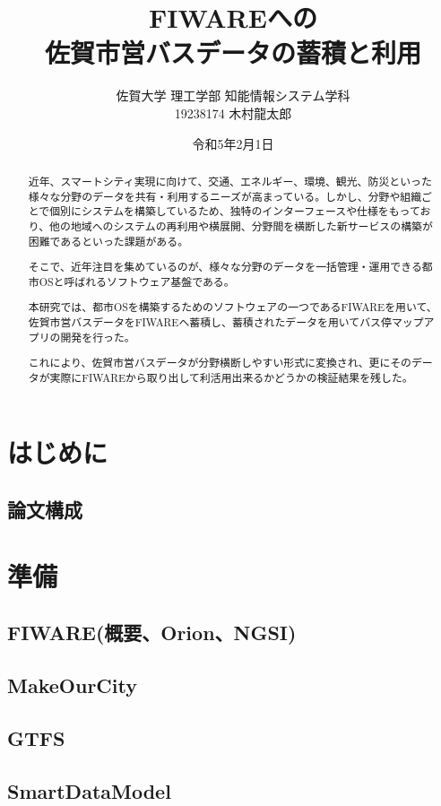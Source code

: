 \documentclass[a4paper, 12pt]{jsreport}
\title{FIWAREへの\\
佐賀市営バスデータの蓄積と利用
}
\author{佐賀大学
理工学部
知能情報システム学科\\
19238174
木村龍太郎}
\date{令和5年2月1日}
\begin{document}
  \maketitle


  \begin{abstract}
    \par 近年、スマートシティ実現に向けて、交通、エネルギー、環境、観光、防災といった様々な分野のデータを共有・利用するニーズが高まっている。しかし、分野や組織ごとで個別にシステムを構築しているため、独特のインターフェースや仕様をもっており、他の地域へのシステムの再利用や横展開、分野間を横断した新サービスの構築が困難であるといった課題がある。
    \par そこで、近年注目を集めているのが、様々な分野のデータを一括管理・運用できる都市OSと呼ばれるソフトウェア基盤である。
    \par 本研究では、都市OSを構築するためのソフトウェアの一つであるFIWAREを用いて、佐賀市営バスデータをFIWAREへ蓄積し、蓄積されたデータを用いてバス停マップアプリの開発を行った。
    \par これにより、佐賀市営バスデータが分野横断しやすい形式に変換され、更にそのデータが実際にFIWAREから取り出して利活用出来るかどうかの検証結果を残した。
  \end{abstract}

  \tableofcontents

  \chapter{はじめに}
  \section{論文構成}


  \chapter{準備}


  \section{FIWARE(概要、Orion、NGSI)}
  \section{MakeOurCity}
  \section{GTFS}
  \section{SmartDataModel}
\end{document}
